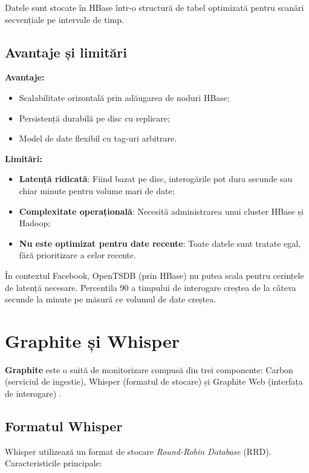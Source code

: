 Datele sunt stocate în HBase într-o structură de tabel optimizată pentru scanări secvențiale pe intervale de timp.

\subsection{Avantaje și limitări}

\textbf{Avantaje:}
\begin{itemize}
    \item Scalabilitate orizontală prin adăugarea de noduri HBase;
    \item Persistență durabilă pe disc cu replicare;
    \item Model de date flexibil cu tag-uri arbitrare.
\end{itemize}

\textbf{Limitări:}
\begin{itemize}
    \item \textbf{Latență ridicată}: Fiind bazat pe disc, interogările pot dura secunde sau chiar minute pentru volume mari de date;
    \item \textbf{Complexitate operațională}: Necesită administrarea unui cluster HBase și Hadoop;
    \item \textbf{Nu este optimizat pentru date recente}: Toate datele sunt tratate egal, fără prioritizare a celor recente.
\end{itemize}

În contextul Facebook, OpenTSDB (prin HBase) nu putea scala pentru cerințele de latență necesare. Percentila 90 a timpului de interogare creștea de la câteva secunde la minute pe măsură ce volumul de date creștea.

\section{Graphite și Whisper}

\textbf{Graphite} este o suită de monitorizare compusă din trei componente: Carbon (serviciul de ingestie), Whisper (formatul de stocare) și Graphite Web (interfața de interogare) \cite{graphite}.

\subsection{Formatul Whisper}

Whisper utilizează un format de stocare \textit{Round-Robin Database} (RRD). Caracteristicile principale:

